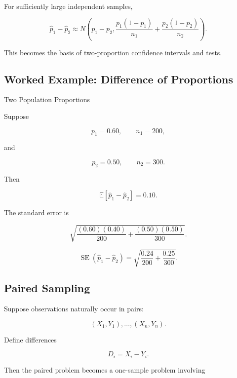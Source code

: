 For sufficiently large independent samples,

\[
\boxed{
\widehat{p}_1-\widehat{p}_2
\approx
N
\left(
p_1-p_2,
\frac{
p_1(1-p_1)
}{
n_1
}
+
\frac{
p_2(1-p_2)
}{
n_2
}
\right).
}
\]

This becomes the basis of two-proportion confidence intervals and tests.

\subsection{Worked Example: Difference of Proportions}
\label{subsec:worked-difference-proportions}

\begin{workedexamplebox}{Two Population Proportions}

Suppose

\[
p_1=0.60,
\qquad
n_1=200,
\]

and

\[
p_2=0.50,
\qquad
n_2=300.
\]

Then

\[
\mathbb{E}
[
\widehat{p}_1-\widehat{p}_2
]
=
0.10.
\]

The standard error is

\[
\sqrt{
\frac{
(0.60)(0.40)
}{200}
+
\frac{
(0.50)(0.50)
}{300}
}.
\]

\begin{answerbox}
\[
\boxed{
\operatorname{SE}
(
\widehat{p}_1-\widehat{p}_2
)
=
\sqrt{
\frac{0.24}{200}
+
\frac{0.25}{300}
}.
}
\]
\end{answerbox}

\end{workedexamplebox}

\subsection{Paired Sampling}
\label{subsec:paired-sampling-distribution}

Suppose observations naturally occur in pairs:

\[
(X_1,Y_1),
\ldots,
(X_n,Y_n).
\]

Define differences

\[
\boxed{
D_i
=
X_i-Y_i.
}
\]

Then the paired problem becomes a one-sample problem involving

